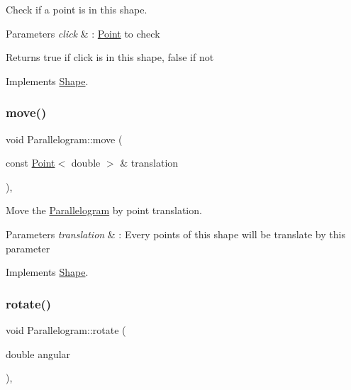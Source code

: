 Check if a point is in this shape. 


\begin{DoxyParams}{Parameters}
{\em click} & \+: \hyperlink{classPoint}{Point} to check \\
\hline
\end{DoxyParams}
\begin{DoxyReturn}{Returns}
true if click is in this shape, false if not 
\end{DoxyReturn}


Implements \hyperlink{classShape_aa09a621da090e42840b4bec7ffb27620}{Shape}.

\mbox{\label{classParallelogram_ae8d51f9b629160df31c8a12c28da279e}} 
\subsubsection{\texorpdfstring{move()}{move()}}
{\footnotesize\ttfamily void Parallelogram\+::move (\begin{DoxyParamCaption}\item[{const \hyperlink{classPoint}{Point}$<$ double $>$ \&}]{translation }\end{DoxyParamCaption})\hspace{0.3cm}{\ttfamily [override]}, {\ttfamily [virtual]}}



Move the \hyperlink{classParallelogram}{Parallelogram} by point translation. 


\begin{DoxyParams}{Parameters}
{\em translation} & \+: Every points of this shape will be translate by this parameter \\
\hline
\end{DoxyParams}


Implements \hyperlink{classShape_a1f447acd6219cb10b9b7a40371519c46}{Shape}.

\mbox{\label{classParallelogram_ac498f6a15dea236ecc49bece023d17b0}} 
\subsubsection{\texorpdfstring{rotate()}{rotate()}}
{\footnotesize\ttfamily void Parallelogram\+::rotate (\begin{DoxyParamCaption}\item[{double}]{angular }\end{DoxyParamCaption})\hspace{0.3cm}{\ttfamily [override]}, {\ttfamily [virtual]}}



